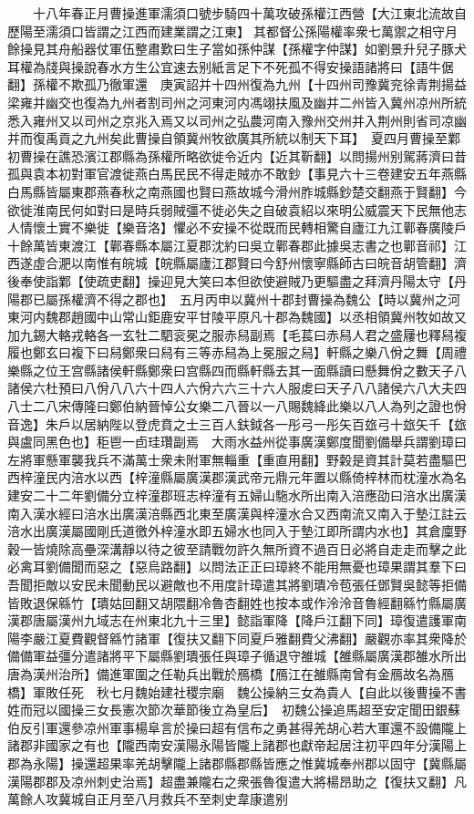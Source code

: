 　　十八年春正月曹操進軍濡須口號步騎四十萬攻破孫權江西營【大江東北流故自歷陽至濡須口皆謂之江西而建業謂之江東】其都督公孫陽權率衆七萬禦之相守月餘操見其舟船器仗軍伍整肅歎曰生子當如孫仲謀【孫權字仲謀】如劉景升兒子豚犬耳權為牋與操說春水方生公宜速去别紙言足下不死孤不得安操語諸將曰【語牛倨翻】孫權不欺孤乃徹軍還　庚寅詔并十四州復為九州【十四州司豫冀兖徐青荆揚益梁雍并幽交也復為九州者割司州之河東河内馮翊扶風及幽并二州皆入冀州凉州所統悉入雍州又以司州之京兆入焉又以司州之弘農河南入豫州交州并入荆州則省司凉幽并而復禹貢之九州矣此曹操自領冀州牧欲廣其所統以制天下耳】　夏四月曹操至鄴　初曹操在譙恐濱江郡縣為孫權所略欲徙令近内【近其靳翻】以問揚州别駕蔣濟曰昔孤與袁本初對軍官渡徙燕白馬民民不得走賊亦不敢鈔【事見六十三卷建安五年燕縣白馬縣皆屬東郡燕春秋之南燕國也賢曰燕故城今滑州胙城縣鈔楚交翻燕于賢翻】今欲徙淮南民何如對曰是時兵弱賊彊不徙必失之自破袁紹以來明公威震天下民無他志人情懷土實不樂徙【樂音洛】懼必不安操不從既而民轉相驚自廬江九江鄿春廣陵戶十餘萬皆東渡江【鄿春縣本屬江夏郡沈約曰吳立鄿春郡此據吳志書之也鄿音祁】江西遂虛合淝以南惟有皖城【皖縣屬廬江郡賢曰今舒州懷寧縣師古曰皖音胡管翻】濟後奉使詣鄴【使疏吏翻】操迎見大笑曰本但欲使避賊乃更驅盡之拜濟丹陽太守【丹陽郡已屬孫權濟不得之郡也】　五月丙申以冀州十郡封曹操為魏公【時以冀州之河東河内魏郡趙國中山常山鉅鹿安平甘陵平原凡十郡為魏國】以丞相領冀州牧如故又加九錫大輅戎輅各一玄牡二駟衮冕之服赤舄副焉【毛萇曰赤舄人君之盛屨也釋舄複履也鄭玄曰複下曰舄鄭衆曰舄有三等赤舄為上冕服之舄】軒縣之樂八佾之舞【周禮樂縣之位王宫縣諸侯軒縣鄭衆曰宫縣四而縣軒縣去其一面縣讀曰懸舞佾之數天子八諸侯六杜預曰八佾八八六十四人六佾六六三十六人服䖍曰天子八八諸侯六八大夫四八士二八宋傳隆曰鄭伯納晉悼公女樂二八晉以一八賜魏絳此樂以八人為列之證也佾音逸】朱戶以居納陛以登虎賁之士三百人鈇鉞各一彤弓一彤矢百玈弓十玈矢千【玈與盧同黑色也】秬鬯一卣珪瓚副焉　大雨水益州從事廣漢鄭度聞劉備舉兵謂劉璋曰左將軍懸軍襲我兵不滿萬士衆未附軍無輜重【重直用翻】野糓是資其計莫若盡驅巴西梓潼民内涪水以西【梓潼縣屬廣漢郡漢武帝元鼎元年置以縣倚梓林而枕潼水為名建安二十二年劉備分立梓潼郡班志梓潼有五婦山駞水所出南入涪應劭曰涪水出廣漢南入漢水經曰涪水出廣漢涪縣西北東至廣漢與梓潼水合又西南流又南入于墊江註云涪水出廣漢屬國剛氏道徼外梓潼水即五婦水也同入于墊江即所謂内水也】其倉廩野穀一皆燒除高壘深溝靜以待之彼至請戰勿許久無所資不過百日必將自走走而擊之此必禽耳劉備聞而惡之【惡烏路翻】以問法正正曰璋終不能用無憂也璋果謂其羣下曰吾聞拒敵以安民未聞動民以避敵也不用度計璋遣其將劉璝冷苞張任鄧賢吳懿等拒備皆敗退保緜竹【璝姑回翻又胡隈翻冷魯杏翻姓也按本或作泠泠音魯經翻緜竹縣屬廣漢郡唐屬漢州九域志在州東北九十三里】懿詣軍降【降戶江翻下同】璋復遣護軍南陽李嚴江夏費觀督緜竹諸軍【復扶又翻下同夏戶雅翻費父沸翻】嚴觀亦率其衆降於備備軍益彊分遣諸將平下屬縣劉璝張任與璋子循退守雒城【雒縣屬廣漢郡雒水所出唐為漢州治所】備進軍圍之任勒兵出戰於鴈橋【鴈江在雒縣南曾有金鴈故名為鴈橋】軍敗任死　秋七月魏始建社稷宗廟　魏公操納三女為貴人【自此以後曹操不書姓而冠以國操三女長憲次節次華節後立為皇后】　初魏公操追馬超至安定聞田銀蘇伯反引軍還參凉州軍事楊阜言於操曰超有信布之勇甚得羌胡心若大軍還不設備隴上諸郡非國家之有也【隴西南安漢陽永陽皆隴上諸郡也獻帝起居注初平四年分漢陽上郡為永陽】操還超果率羌胡擊隴上諸郡縣郡縣皆應之惟冀城奉州郡以固守【冀縣屬漢陽郡郡及凉州刺史治焉】超盡兼隴右之衆張魯復遣大將楊昂助之【復扶又翻】凡萬餘人攻冀城自正月至八月救兵不至刺史韋康遣别